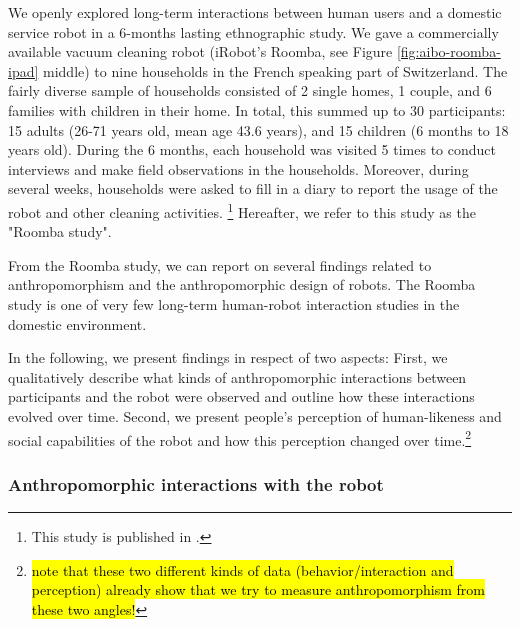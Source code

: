 \documentclass{frontiersSCNS} %
\begin{document}
We openly explored long-term interactions between human users and a domestic
service robot in a 6-months lasting ethnographic study. We gave a commercially
available vacuum cleaning robot (iRobot's Roomba, see Figure
\ref{fig:aibo-roomba-ipad} middle) to nine households in the French speaking
part of Switzerland. The fairly diverse sample of households consisted of 2
single homes, 1 couple, and 6 families with children in their home. In total,
this summed up to 30 participants: 15 adults (26-71 years old, mean age 43.6
years), and 15 children (6 months to 18 years old). During the 6 months, each
household was visited 5 times to conduct interviews and make field observations
in the households. Moreover, during several weeks, households were asked to fill
in a diary to report the usage of the robot and other cleaning activities.
\footnote{This study is published in \cite{fink_living_2013}.} Hereafter, we
refer to this study as the "Roomba study".


From the Roomba study, we can report on several findings related to
anthropomorphism and the anthropomorphic design of robots.
The Roomba study is one of very few long-term human-robot interaction studies in
the domestic environment. 

In the following, we present findings in respect of two aspects: First, we
qualitatively describe what kinds of anthropomorphic interactions between
participants and the robot were observed and outline how these interactions
evolved over time.  Second, we present people's perception of human-likeness and
social capabilities of the robot and how this perception changed over
time.\footnote{\hl{note that these two different kinds of data
(behavior/interaction and perception) already show that we try to measure
anthropomorphism from these two angles!}}

\subsubsection{Anthropomorphic interactions with the robot\\}
\end{document}
